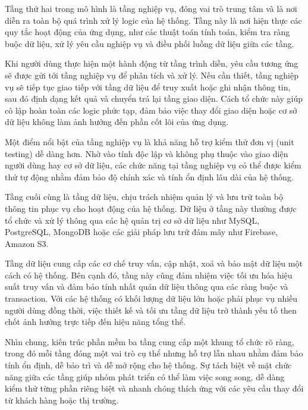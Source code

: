   
  Tầng thứ hai trong mô hình là tầng nghiệp vụ, đóng vai trò trung tâm và là nơi diễn ra toàn bộ quá trình xử lý logic của hệ thống. Tầng này là nơi hiện thực các quy tắc hoạt động của ứng dụng, như các thuật toán tính toán, kiểm tra ràng buộc dữ liệu, xử lý yêu cầu nghiệp vụ và điều phối luồng dữ liệu giữa các tầng.
  \vspace{0.5em}
  
  
  Khi người dùng thực hiện một hành động từ tầng trình diễn, yêu cầu tương ứng sẽ được gửi tới tầng nghiệp vụ để phân tích và xử lý. Nếu cần thiết, tầng nghiệp vụ sẽ tiếp tục giao tiếp với tầng dữ liệu để truy xuất hoặc ghi nhận thông tin, sau đó định dạng kết quả và chuyển trả lại tầng giao diện. Cách tổ chức này giúp cô lập hoàn toàn các logic phức tạp, đảm bảo việc thay đổi giao diện hoặc cơ sở dữ liệu không làm ảnh hưởng đến phần cốt lõi của ứng dụng.
  \vspace{0.5em}
  
  
  Một điểm nổi bật của tầng nghiệp vụ là khả năng hỗ trợ kiểm thử đơn vị (unit testing) dễ dàng hơn. Nhờ vào tính độc lập và không phụ thuộc vào giao diện người dùng hay cơ sở dữ liệu, các chức năng tại tầng nghiệp vụ có thể được kiểm thử tự động nhằm đảm bảo độ chính xác và tính ổn định lâu dài của hệ thống.
  \vspace{0.5em}
  
  
  Tầng cuối cùng là tầng dữ liệu, chịu trách nhiệm quản lý và lưu trữ toàn bộ thông tin phục vụ cho hoạt động của hệ thống. Dữ liệu ở tầng này thường được tổ chức và xử lý thông qua các hệ quản trị cơ sở dữ liệu như MySQL, PostgreSQL, MongoDB hoặc các giải pháp lưu trữ đám mây như Firebase, Amazon S3.
  \vspace{0.5em}
  
  
  Tầng dữ liệu cung cấp các cơ chế truy vấn, cập nhật, xoá và bảo mật dữ liệu một cách có hệ thống. Bên cạnh đó, tầng này cũng đảm nhiệm việc tối ưu hóa hiệu suất truy vấn và đảm bảo tính nhất quán dữ liệu thông qua các ràng buộc và transaction. Với các hệ thống có khối lượng dữ liệu lớn hoặc phải phục vụ nhiều người dùng đồng thời, việc thiết kế và tối ưu tầng dữ liệu trở thành yếu tố then chốt ảnh hưởng trực tiếp đến hiệu năng tổng thể.
  \vspace{0.5em}
  
  
  Nhìn chung, kiến trúc phần mềm ba tầng cung cấp một khung tổ chức rõ ràng, trong đó mỗi tầng đóng một vai trò cụ thể nhưng hỗ trợ lẫn nhau nhằm đảm bảo tính ổn định, dễ bảo trì và dễ mở rộng cho hệ thống. Sự tách biệt về mặt chức năng giữa các tầng giúp nhóm phát triển có thể làm việc song song, dễ dàng kiểm thử từng phần riêng biệt và nhanh chóng thích ứng với các yêu cầu thay đổi từ khách hàng hoặc thị trường.
  \vspace{0.5em}
  
